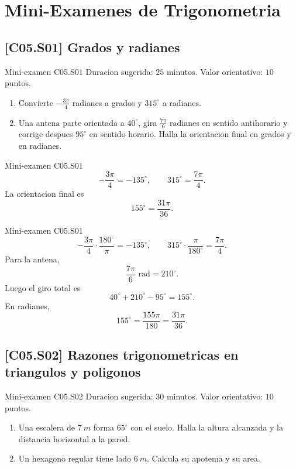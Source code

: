 \chapter{Mini-Examenes de Trigonometria}

\section{[C05.S01] Grados y radianes}

\begin{exambrief}{Mini-examen C05.S01}
Duracion sugerida: \(25\) minutos. Valor orientativo: \(10\) puntos.
\begin{enumerate}
  \item Convierte \(-\frac{3\pi}{4}\) radianes a grados y \(315^\circ\) a radianes.
  \item Una antena parte orientada a \(40^\circ\), gira \(\frac{7\pi}{6}\) radianes en sentido
  antihorario y corrige despues \(95^\circ\) en sentido horario. Halla la orientacion final en
  grados y en radianes.
\end{enumerate}
\end{exambrief}

\begin{shortanswer}{Mini-examen C05.S01}
\[
-\frac{3\pi}{4}=-135^\circ,
\qquad
315^\circ=\frac{7\pi}{4}.
\]
La orientacion final es
\[
155^\circ=\frac{31\pi}{36}.
\]
\end{shortanswer}

\begin{fullsolution}{Mini-examen C05.S01}
\[
-\frac{3\pi}{4}\cdot \frac{180^\circ}{\pi}=-135^\circ,
\qquad
315^\circ\cdot \frac{\pi}{180^\circ}=\frac{7\pi}{4}.
\]
Para la antena,
\[
\frac{7\pi}{6}\text{ rad}=210^\circ.
\]
Luego el giro total es
\[
40^\circ+210^\circ-95^\circ=155^\circ.
\]
En radianes,
\[
155^\circ=\frac{155\pi}{180}=\frac{31\pi}{36}.
\]
\end{fullsolution}

\section{[C05.S02] Razones trigonometricas en triangulos y poligonos}

\begin{exambrief}{Mini-examen C05.S02}
Duracion sugerida: \(30\) minutos. Valor orientativo: \(10\) puntos.
\begin{enumerate}
  \item Una escalera de \(\SI{7}{m}\) forma \(65^\circ\) con el suelo. Halla la altura alcanzada
  y la distancia horizontal a la pared.
  \item Un hexagono regular tiene lado \(\SI{6}{m}\). Calcula su apotema y su area.
\end{enumerate}
\end{exambrief}

